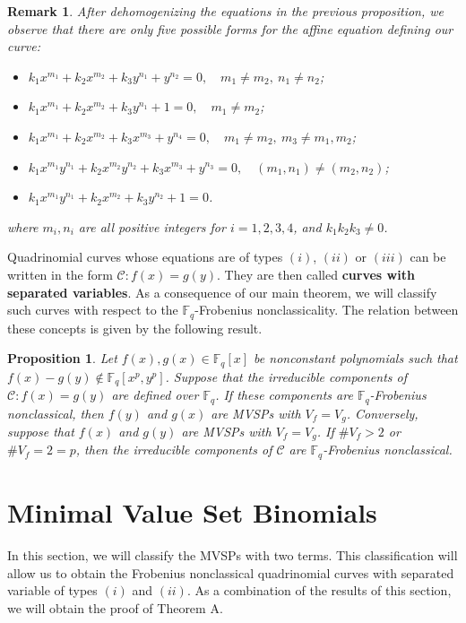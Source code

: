 \documentclass[preprint,12pt]{elsarticle}
\newtheorem{proposition}[theorem]{Proposition}
\newtheorem{remark}[theorem]{Remark}
\begin{document}
\begin{remark}\label{quadrinomials}
    After dehomogenizing the equations in the previous proposition, we observe that there are only five possible forms for the affine equation defining our curve: 
    \begin{itemize}
        \item[$\mathrm{(i)}$] $k_1x^{m_1} + k_2x^{m_2} + k_3y^{n_1} + y^{n_2} = 0, \quad m_1 \neq m_2,\ n_1 \neq n_2$;
        \item[$\mathrm{(ii)}$] $k_1x^{m_1} + k_2x^{m_2} + k_3y^{n_1} + 1 = 0, \quad m_1 \neq m_2$;
        \item[$\mathrm{(iii)}$] $k_1x^{m_1} + k_2x^{m_2} + k_3x^{m_3} + y^{n_4} = 0, \quad m_1 \neq m_2,\ m_3 \neq m_1, m_2$;
        \item[$\mathrm{(iv)}$] $k_1x^{m_1}y^{n_1} + k_2x^{m_2}y^{n_2} + k_3x^{m_3} + y^{n_3} = 0, \quad (m_1,n_1) \neq (m_2,n_2)$;
        \item[$\mathrm{(v)}$] $k_1x^{m_1}y^{n_1} + k_2x^{m_2} + k_3y^{n_2} + 1 = 0$.
    \end{itemize}
where  $m_i, n_i$ are all positive integers for $i = 1,2,3,4$, and $k_1k_2k_3 \neq 0$.
\end{remark}

Quadrinomial curves whose equations are of types $(i)$, $(ii)$ or $(iii)$ can be written in the form $\mathcal{C}: f(x) = g(y)$. They are then called \textbf{curves with separated variables}. As a consequence of our main theorem, we will classify such curves with respect to the $\mathbb{F}_{q}$-Frobenius nonclassicality. The relation between these concepts is given by the following result.

\begin{proposition}\cite[Corollary 3.5]{borges-separated}\label{borges-MVSPcondition}
    Let $f(x), g(x) \in \mathbb{F}_q[x]$ be nonconstant polynomials such that $f(x) - g(y) \notin \mathbb{F}_q[x^p, y^p]$. Suppose that the irreducible components of $\mathcal{C} : f(x) = g(y)$ are defined over $\mathbb{F}_q$. If these components are $\mathbb{F}_q$-Frobenius nonclassical, then $f(y)$ and $g(x)$ are MVSPs with $V_f = V_g$. Conversely, suppose that $f(x)$ and $g(y)$ are MVSPs with $V_f = V_g$. If $\#V_f > 2$ or $\#V_f = 2 = p$, then the irreducible components of $\mathcal{C}$ are $\mathbb{F}_q$-Frobenius nonclassical.
\end{proposition}

\section{Minimal Value Set Binomials}\label{section:MVSB}
In this section, we will classify the MVSPs with two terms. This classification will allow us to obtain the Frobenius nonclassical quadrinomial curves with separated variable of types $(i)$ and $(ii)$. As a combination of the results of this section, we will obtain the proof of Theorem A.
\end{document}
